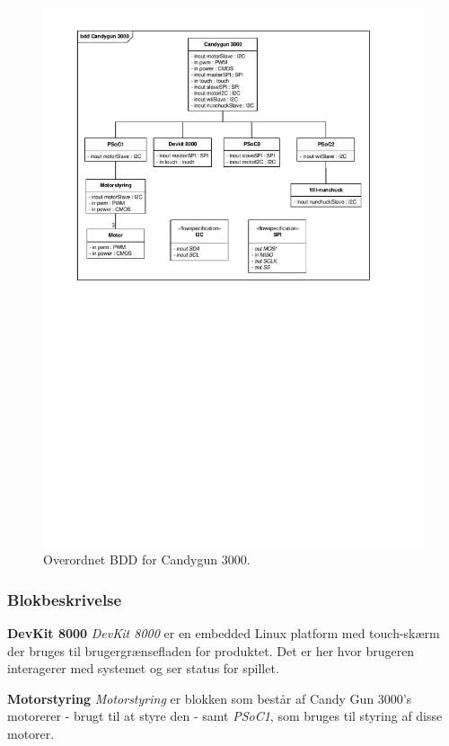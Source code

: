 \begin{figure}[H]
	\centering
	\includegraphics[trim = {1.8cm 14.6cm 1.8cm 1cm}, clip = true, width = \textwidth]{Systemarkitektur/images/BDD_overordnet.pdf}
	\caption{Overordnet BDD for Candygun 3000.}
	\label{fig:BDD}
\end{figure}


\subsubsection{Blokbeskrivelse}
\textbf{DevKit 8000}
\newline
\textit{DevKit 8000} er en embedded Linux platform med touch-skærm der bruges til brugergrænsefladen for produktet. Det er her hvor brugeren interagerer med systemet og ser status for spillet.

\textbf{Motorstyring}
\newline
\textit{Motorstyring} er blokken som består af Candy Gun 3000's motorerer - brugt til at styre den - samt \textit{PSoC1}, som bruges til styring af disse motorer.

